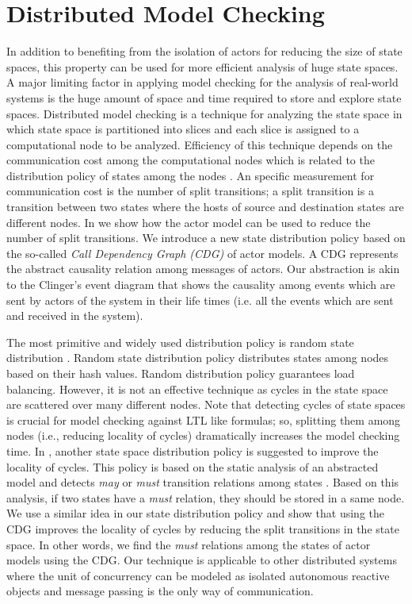 \section{Distributed Model Checking} \label{sec::DMC}
In addition to benefiting from the isolation of actors for reducing the size of state spaces, this property can be used for more efficient analysis of huge state spaces. A major limiting factor in applying model checking for the analysis of real-world systems is the huge amount of space and time required to store and explore state spaces. Distributed model checking is a technique for analyzing the state space in which state space is partitioned into slices and each slice is assigned to a computational node to be analyzed. Efficiency of this technique depends on the communication cost among the computational nodes which is related to the distribution policy of states among the nodes \cite{DBLP:journals/entcs/OrzanPE05}.
%
An specific measurement for communication cost is the number of split transitions; a split transition is a transition between two states  where the hosts of source and destination states are different nodes. In \cite{DBLP:journals/eceasst/KhamespanahSMSR15} we show how the actor model can be used to reduce the number of split transitions. We introduce a new state distribution policy based on the so-called \textit{Call Dependency Graph (CDG)} of actor models. A CDG represents the abstract causality relation among messages of actors. Our abstraction is akin to the Clinger's event diagram \cite{clinger} that shows the causality among events which are sent by actors of the system in their life times (i.e. all the events which are sent and received in the system).

The most primitive and widely used distribution policy is random state distribution \cite{DBLP:journals/entcs/GaravelMS13}. Random state distribution policy distributes states among nodes based on their hash values. Random distribution policy guarantees load balancing. However, it is not an effective technique as cycles in the state space are scattered over many different nodes. Note that detecting cycles of state spaces is crucial for model checking against LTL like formulas; so, splitting them among nodes (i.e., reducing locality of cycles) dramatically increases the model checking time. In \cite{DBLP:journals/entcs/OrzanPE05}, another state space distribution policy is suggested to improve the locality of cycles. This policy is based on the static analysis of an abstracted model and detects \emph{may} or \emph{must} transition relations among states \cite{DBLP:conf/lics/LarsenT88}.
Based on this analysis, if two states have a \emph{must} relation, they should be stored in a same node. We use a similar idea in our state distribution policy and show that using the CDG improves the locality of cycles by reducing the split transitions in the state space. In other words, we find the \emph{must} relations among the states of actor models using the CDG. Our technique is applicable to other distributed systems where the unit of concurrency can be modeled as isolated autonomous reactive objects and message passing is the only way of communication. 

